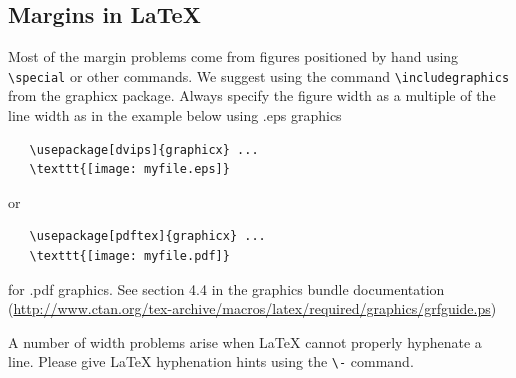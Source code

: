 \documentclass{article} %
\begin{document}
\subsection{Margins in LaTeX}
 
Most of the margin problems come from figures positioned by hand using
\verb+\special+ or other commands. We suggest using the command
\verb+\includegraphics+
from the graphicx package. Always specify the figure width as a multiple of
the line width as in the example below using .eps graphics
\begin{verbatim}
   \usepackage[dvips]{graphicx} ... 
   \texttt{[image: myfile.eps]} 
\end{verbatim}
or %
\begin{verbatim}
   \usepackage[pdftex]{graphicx} ... 
   \texttt{[image: myfile.pdf]} 
\end{verbatim}
for .pdf graphics. 
See section 4.4 in the graphics bundle documentation (\url{http://www.ctan.org/tex-archive/macros/latex/required/graphics/grfguide.ps}) 
 
A number of width problems arise when LaTeX cannot properly hyphenate a
line. Please give LaTeX hyphenation hints using the \verb+\-+ command.
\end{document}
